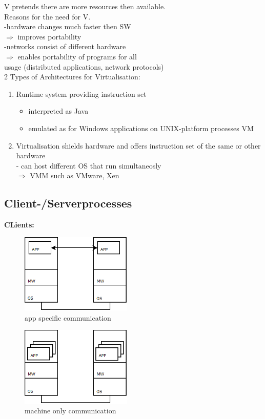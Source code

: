 \documentclass[ngerman,a4paper]{report}
\begin{document}
V pretends there are more resources then available.\\

Reasons for the need for V.\\
-hardware changes much faster then SW\\
$\Rightarrow$ improves portability\\
-networks consist of different hardware\\
$\Rightarrow$ enables portability of programs for all\\
usage (distributed applications, network protocols)\\

2 Types of Architectures for Virtualisation:\\
\begin{enumerate}
\item Runtime system providing instruction set\\
	\begin{itemize}
	\item interpreted as Java
	\item emulated as for Windows applications on UNIX-platform processes VM
	\end{itemize}
\item Virtualisation shields hardware and offers instruction set of the same or other hardware\\
- can host different OS that run simultaneosly\\
$\Rightarrow$ VMM such as VMware, Xen\\


\end{enumerate}


\subsection{Client-/Serverprocesses}
\textbf{CLients:}\\
\begin{figure}[h]
	\centering
	\includegraphics[width=200px]{gfx/clienta.png}
	\caption{app specific communication}
	\label{img:clienta}
\end{figure}
\begin{figure}[h]
	\centering
	\includegraphics[width=200px]{gfx/clientb.png}
	\caption{machine only communication}
	\label{img:clientb}
\end{figure}
\end{document}
